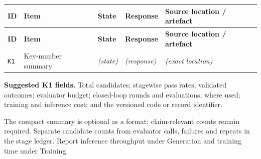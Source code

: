 \documentclass[10pt,a4paper]{article}
\newcommand{\ResponseTableHeader}{%
\toprule
\textbf{ID} & \textbf{Item} & \textbf{State} & \textbf{Response} & \textbf{Source location / artefact}\\
\midrule}
\begin{document}
\begin{longtable}{@{}L{0.05\textwidth} N{0.16\textwidth} L{0.14\textwidth} L{0.37\textwidth} L{0.20\textwidth}@{}}
\ResponseTableHeader
\endfirsthead
\ResponseTableHeader
\endhead
\bottomrule
\endfoot
\texttt{K1} & Key-number summary & \emph{(state)} & \emph{(response)} & \emph{(exact location)}\\
\end{longtable}

\noindent\footnotesize\textbf{Suggested K1 fields.} Total candidates; stagewise pass rates; validated outcomes; evaluator budget; closed-loop rounds and evaluations, where used; training and inference cost; and the versioned code or record identifier.

\medskip\noindent The compact summary is optional as a format; claim-relevant counts remain required. Separate candidate counts from evaluator calls, failures and repeats in the stage ledger. Report inference throughput under Generation and training time under Training.
\end{document}
